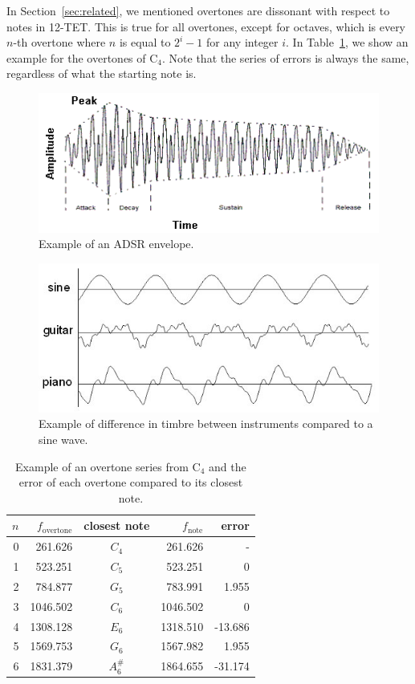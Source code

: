 \documentclass[a4paper,10pt,twocolumn]{article}
\newcommand{\note}[2]{#1${}_{#2}$}
\begin{document}
In Section~\ref{sec:related}, we mentioned overtones are dissonant with respect to notes in 12-TET. This is true for all overtones, except for octaves, which is every $n$-th overtone where $n$ is equal to $2^i - 1$ for any integer $i$. In Table~\ref{tab:overseries}, we show an example for the overtones of \note{C}{4}. Note that the series of errors is always the same, regardless of what the starting note is. 
\begin{figure}[h]
    \centering
    \includegraphics[width=\linewidth]{fig/envelope.png}
    \caption{Example of an ADSR envelope.}
    \label{fig:adsr}
\end{figure}
\begin{figure}[h]
    \centering
    \includegraphics[width=0.95\linewidth]{fig/timbre.jpg}
    \caption{Example of difference in timbre between instruments compared to a sine wave.}
    \label{fig:timbre}
\end{figure}
\begin{table}[h!]
    \centering
    \begin{tabular}{rrcrr}
        $n$ & $f_{\text{overtone}}$ & closest note & $f_\text{note}$ & error \\
        \hline
        0 & 261.626  & $C_4$    & 261.626  &  - \\
        1 & 523.251  & $C_5$    & 523.251  &  0 \\
        2 & 784.877  & $G_5$    & 783.991  &  1.955 \\
        3 & 1046.502 & $C_6$    & 1046.502 &  0 \\
        4 & 1308.128 & $E_6$    & 1318.510 &  -13.686 \\
        5 & 1569.753 & $G_6$    & 1567.982 &  1.955 \\
        6 & 1831.379 & $A^\#_6$ & 1864.655 &  -31.174
    \end{tabular}
    \caption{Example of an overtone series from \note{C}{4} and the error of each overtone compared to its closest note.}
    \label{tab:overseries}
\end{table}
\end{document}
